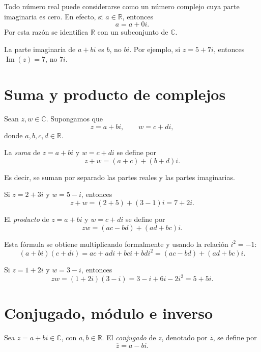 Todo número real puede considerarse como un número complejo cuya parte imaginaria es cero. En efecto, si \(a\in\mathbb{R}\), entonces
\[
  a=a+0i.
\]
Por esta razón se identifica \(\mathbb{R}\) con un subconjunto de \(\mathbb{C}\).

\begin{advertencia}
La parte imaginaria de \(a+bi\) es \(b\), no \(bi\). Por ejemplo, si \(z=5+7i\), entonces \(\operatorname{Im}(z)=7\), no \(7i\).
\end{advertencia}

\section{Suma y producto de complejos}

Sean \(z,w\in\mathbb{C}\). Supongamos que
\[
  z=a+bi,
  \qquad
  w=c+di,
\]
donde \(a,b,c,d\in\mathbb{R}\).

\begin{definicion}
La \emph{suma} de \(z=a+bi\) y \(w=c+di\) se define por
\[
  z+w=(a+c)+(b+d)i.
\]
\end{definicion}

Es decir, se suman por separado las partes reales y las partes imaginarias.

\begin{ejemplo}
Si \(z=2+3i\) y \(w=5-i\), entonces
\[
  z+w=(2+5)+(3-1)i=7+2i.
\]
\end{ejemplo}

\begin{definicion}
El \emph{producto} de \(z=a+bi\) y \(w=c+di\) se define por
\[
  zw=(ac-bd)+(ad+bc)i.
\]
\end{definicion}

Esta fórmula se obtiene multiplicando formalmente y usando la relación \(i^2=-1\):
\[
(a+bi)(c+di)=ac+adi+bci+bdi^2=(ac-bd)+(ad+bc)i.
\]

\begin{ejemplo}
Si \(z=1+2i\) y \(w=3-i\), entonces
\[
  zw=(1+2i)(3-i)=3-i+6i-2i^2=5+5i.
\]
\end{ejemplo}

\section{Conjugado, módulo e inverso}

\begin{definicion}[Conjugado]
Sea \(z=a+bi\in\mathbb{C}\), con \(a,b\in\mathbb{R}\). El \emph{conjugado} de \(z\), denotado por \(\overline{z}\), se define por
\[
  \overline{z}=a-bi.
\]
\end{definicion}

